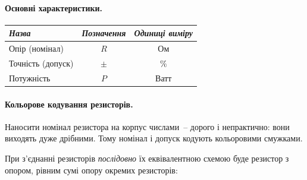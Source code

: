 \documentclass[12pt,a4paper]{book}  %
\begin{document}
\paragraph{Основні характеристики.}

\begin{center}
\begin{tabular}{|l|c|c|}
\hline
\textit{Назва} & \textit{Позначення} & \textit{Одиниці виміру} \\
\hline
Опір (номінал) & $R$ & Ом \\
\hline		
Точність (допуск) & $\pm$ & $ \% $ \\
\hline
Потужність & $P$ & Ватт \\
\hline
\end{tabular}
\end{center}

\begin{figure}[h!]
\label{ris:image}
\end{figure}



\paragraph{Кольорове кодування резисторів.}

Наносити номінал резистора на корпус числами~-- дорого і непрактично: вони виходять дуже дрібними. Тому номінал і допуск кодують кольоровими смужками.

При з'єднанні резисторів \textit{послідовно} їх еквівалентною схемою буде резистор з опором, рівним сумі опору окремих резисторів:
\end{document}
